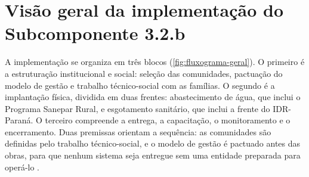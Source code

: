 \section{Visão geral da implementação do Subcomponente 3.2.b}
\label{sec:arranjo}

A implementação se organiza em três blocos (\autoref{fig:fluxograma-geral}). O
primeiro é a estruturação institucional e social: seleção das comunidades,
pactuação do modelo de gestão e trabalho técnico-social com as famílias. O
segundo é a implantação física, dividida em duas frentes: abastecimento de
água, que inclui o Programa Sanepar Rural, e esgotamento sanitário, que inclui
a frente do IDR-Paraná. O terceiro compreende a entrega, a capacitação, o
monitoramento e o encerramento. Duas premissas orientam a sequência: as
comunidades são definidas pelo trabalho técnico-social, e o modelo de gestão é
pactuado antes das obras, para que nenhum sistema seja entregue sem uma
entidade preparada para operá-lo \cite{mop2026}.


